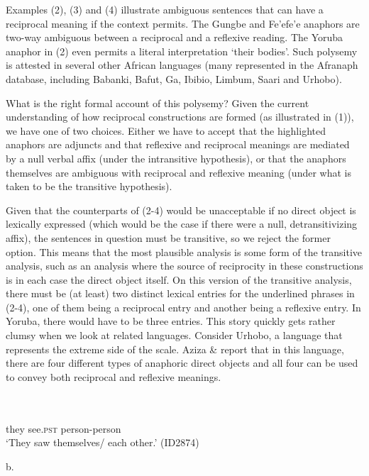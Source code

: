 \documentclass[output=paper]{langsci/langscibook}
\begin{document}
Examples (2), (3) and (4) illustrate ambiguous sentences that can have a reciprocal meaning if the context permits. The Gungbe and Fe'efe'e anaphors are two-way ambiguous between a reciprocal and a reflexive reading. The Yoruba anaphor in (2) even permits a literal interpretation ‘their bodies’. Such polysemy is attested in several other African languages (many represented in the Afranaph database, including Babanki, Bafut, Ga, Ibibio, Limbum, Saari and Urhobo).

  What is the right formal account of this polysemy? Given the current understanding of how reciprocal constructions are formed (as illustrated in (1)), we have one of two choices. Either we have to accept that the highlighted anaphors are adjuncts and that reflexive and reciprocal meanings are mediated by a null verbal affix (under the intransitive hypothesis), or that the anaphors themselves are ambiguous with reciprocal and reflexive meaning (under what is taken to be the transitive hypothesis). 

  Given that the counterparts of (2-4) would be unacceptable if no direct object is lexically expressed (which would be the case if there were a null, detransitivizing affix), the sentences in question must be transitive, so we reject the former option. This means that the most plausible analysis is some form of the transitive analysis, such as an analysis where the source of reciprocity in these constructions is in each case the direct object itself. On this version of the transitive analysis, there must be (at least) two distinct lexical entries for the underlined phrases in (2-4), one of them being a reciprocal entry and another being a reflexive entry. In Yoruba, there would have to be three entries. This story quickly gets rather clumsy when we look at related languages. Consider Urhobo, a language that represents the extreme side of the scale. Aziza \& \citet{Safir2006} report that in this language, there are four different types of anaphoric direct objects and all four can be used to convey both reciprocal and reflexive meanings. 


\ea\label{ex:}
 \\
\ea\label{ex:}
 \\

       they   see.\textsc{pst}   person-person \\
\glt   ‘They saw themselves/ each other.’ (ID2874)
\z

\glt b.      \textstylelsLanginfoChar{} 
\z
\end{document}
